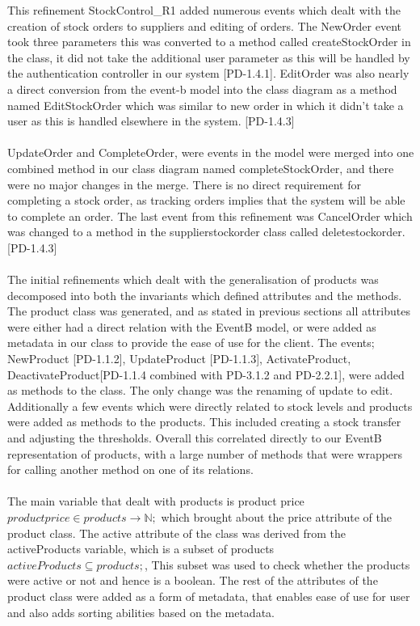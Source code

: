 \documentclass[a4paper]{article}
\begin{document}
This refinement StockControl\_R1 added numerous events which dealt with the creation of stock orders to suppliers and editing of orders. The NewOrder event took three parameters this was converted to a method called createStockOrder in the class, it did not take the additional user parameter as this will be handled by the authentication controller in our system [PD-1.4.1]. EditOrder was also nearly a direct conversion from the event-b model into the class diagram as a method named EditStockOrder which was similar to new order in which it didn't take a user as this is handled elsewhere in the system. [PD-1.4.3]
\\\\
UpdateOrder and CompleteOrder, were events in the model were merged into one combined method in our class diagram named completeStockOrder, and there were no major changes in the merge. There is no direct requirement for completing a stock order, as tracking orders implies that the system will be able to complete an order. The last event from this refinement was CancelOrder which was changed to a method in the supplierstockorder class called deletestockorder. [PD-1.4.3]
\\\\
The initial refinements which dealt with the generalisation of products was decomposed into both the invariants which defined attributes and the methods. The product class was generated, and as stated in previous sections all attributes were either had a direct relation with the EventB model, or were added as metadata in our class to provide the ease of use for the client. The events; NewProduct [PD-1.1.2], UpdateProduct [PD-1.1.3], ActivateProduct, DeactivateProduct[PD-1.1.4 combined with PD-3.1.2 and PD-2.2.1], were added as methods to the class. The only change was the renaming of update to edit. Additionally a few events which were directly related to stock levels and products were added as methods to the products. This included creating a stock transfer and adjusting the thresholds. Overall this correlated directly to our EventB representation of products, with a large number of methods that were wrappers for calling another method on one of its relations.
\\\\
The main variable that dealt with products is product price \(productprice ∈ products → ℕ;\) which brought about the price attribute of the product class. The active attribute of the class was derived from the activeProducts variable, which is a subset of products \(activeProducts ⊆ products;\), This subset was used to check whether the products were active or not and hence is a boolean. The  rest of the attributes of the product class were added as a form of metadata, that enables ease of use for user and also adds sorting abilities based on the metadata.
\end{document}
